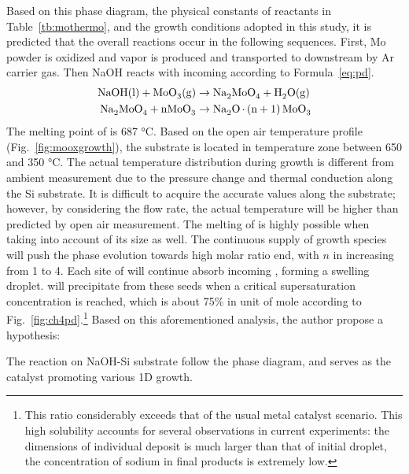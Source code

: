 Based on this phase diagram, the physical constants of reactants in Table~\ref{tb:mothermo}, and the growth conditions adopted in this study, it is predicted that the overall reactions occur in the following sequences. First, Mo powder is oxidized and  vapor is produced and transported to downstream by Ar carrier gas. Then NaOH reacts with incoming  according to Formula~\ref{eq:pd}. 
\begin{subequations}\label{eq:pd}
\begin{align}
\cee{NaOH(l) + MoO3(g) &\rightarrow Na2MoO4 + H2O(g)\\
Na2MoO4 + nMoO3   &\rightarrow Na2O.(n + 1)MoO3}
\end{align}
\end{subequations}
The melting point of  is 687 \si{\degreeCelsius}. Based on the open air temperature profile (Fig.~\ref{fig:mooxgrowth}), the substrate is located in temperature zone between 650 and 350 \si{\degreeCelsius}. The actual temperature distribution during growth is different from ambient measurement due to the pressure change and thermal conduction along the Si substrate. It is difficult to acquire the accurate values along the substrate; however, by considering the flow rate, the actual temperature will be higher than predicted by open air measurement.\cite{Subannajui2010} The melting of  is highly possible when taking into account of its size as well.\cite{Bruggemann1997} The continuous supply of  growth species will push the phase evolution towards high  molar ratio end, with $n$ in  increasing from 1 to 4. Each site of  will continue absorb incoming , forming a swelling droplet.  will precipitate from these seeds when a critical supersaturation concentration is reached, which is about 75\% in unit of mole according to Fig.~\ref{fig:ch4pd}.\footnote{This ratio considerably exceeds that of the usual metal catalyst scenario. This high solubility accounts for several observations in current experiments: the dimensions of individual deposit is much larger than that of initial droplet, the concentration of sodium in final products is extremely low.}    Based on this aforementioned analysis, the author propose a hypothesis:


The reaction on NaOH-Si substrate follow the phase diagram, and  serves as the catalyst promoting various 1D  growth.


